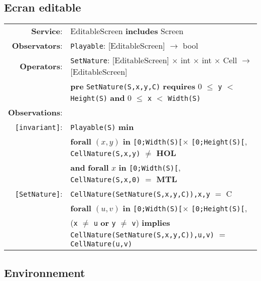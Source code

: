 \documentclass{article}
\begin{document}
\subsection*{Ecran editable}

\begin{tabular}{rl}
\textbf{Service}: & \textrm{EditableScreen} {\bf includes} \textrm{Screen}  \\
\textbf{Observators}: & \texttt{Playable}: \textrm{[EditableScreen]} $\rightarrow$ \textrm{bool} \\
\textbf{Operators}: & \texttt{SetNature}: \textrm{[EditableScreen]} $\times$ \textrm{int} $\times$ \textrm{int} $\times$ \textrm{Cell}  $\rightarrow$ \textrm{[EditableScreen]} \\
& \quad \textbf{pre } \texttt{SetNature(S,x,y,C)} \textbf{ requires } 0 $\leq$ \texttt{y} $<$ \texttt{Height(S)} \textbf{ and } 0 $\leq$ \texttt{x} $<$ \texttt{Width(S)}\\
\textbf{Observations}: \\
\texttt{[invariant]}: & \texttt{Playable(S)} \textbf{min} \\
& \quad\quad\quad\quad \textbf{forall} $(x,y)$ \textbf{in} \texttt{[0;Width(S)[}$\times$ \texttt{[0;Height(S)[}, \texttt{CellNature(S,x,y)} $\neq$ \textbf{HOL}  \\
& \quad\quad\quad\quad \textbf{and} \textbf{forall} $x$ \textbf{in} \texttt{[0;Width(S)[}, \texttt{CellNature(S,x,0)} $=$ \textbf{MTL}  \\
\texttt{[SetNature]}: & \texttt{CellNature(SetNature(S,x,y,C)),x,y} $=$ C \\
        & \textbf{forall} $(u,v)$ \textbf{in} \texttt{[0;Width(S)[}$\times$ \texttt{[0;Height(S)[}, \\ & \quad\quad\quad\quad (\texttt{x} $\neq$ \texttt{u} \textbf{or} \texttt{y} $\neq$ \texttt{v}) \textbf{implies} \texttt{CellNature(SetNature(S,x,y,C)),u,v)} $=$ \texttt{CellNature(u,v)} \\
\end{tabular}


\subsection*{Environnement}
\end{document}
